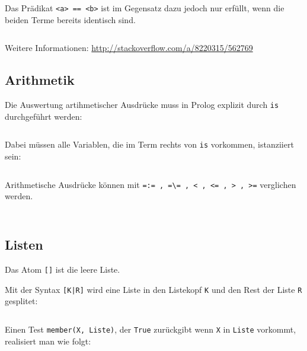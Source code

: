Das Prädikat \texttt{<a> == <b>} ist im Gegensatz dazu jedoch nur erfüllt, wenn
die beiden Terme bereits identisch sind.

\begin{beispiel}[= und ==]
    \inputminted[numbersep=5pt, tabsize=4]{prolog}{scripts/prolog/equal.pl}
\end{beispiel}

Weitere Informationen: \url{http://stackoverflow.com/a/8220315/562769}

\subsection{Arithmetik}
Die Auswertung artihmetischer Ausdrücke muss in Prolog explizit durch \texttt{is}
durchgeführt werden:

\inputminted[numbersep=5pt, tabsize=4]{prolog}{scripts/prolog/arithmetik.pl}

Dabei müssen alle Variablen, die im Term rechts von \texttt{is} vorkommen, 
istanziiert sein:

\inputminted[numbersep=5pt, tabsize=4]{prolog}{scripts/prolog/arithmetik-fail.pl}

Arithmetische Ausdrücke können mit \texttt{=:= , =\textbackslash= , < , <= , > , >=}
verglichen werden.

\begin{beispiel}
    \begin{bspenum}
        \item \inputminted[numbersep=5pt, tabsize=4]{prolog}{scripts/prolog/even.pl}
        \item \inputminted[numbersep=5pt, tabsize=4]{prolog}{scripts/prolog/fibonacci2.pl}
    \end{bspenum}
\end{beispiel}

\subsection{Listen}
Das Atom \texttt{[]} ist die leere Liste.

Mit der Syntax \texttt{[K|R]} wird eine Liste in den Listekopf \texttt{K} und
den Rest der Liste \texttt{R} gesplitet:

\inputminted[numbersep=5pt, tabsize=4]{prolog}{scripts/prolog/liste-basic.pl}

Einen Test \texttt{member(X, Liste)}, der \texttt{True} zurückgibt wenn \texttt{X}
in \texttt{Liste} vorkommt, realisiert man wie folgt:

